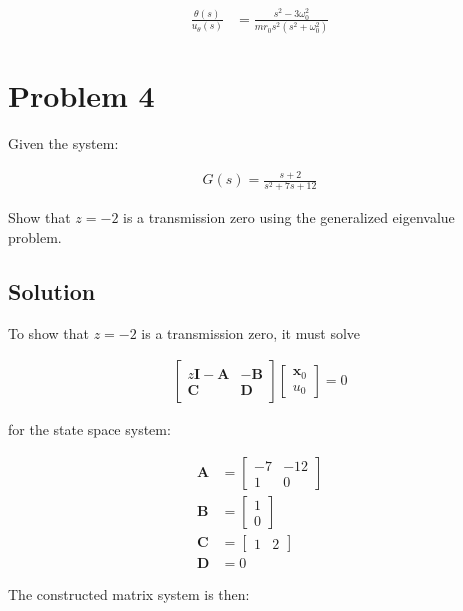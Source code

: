\documentclass[]{article}
\begin{document}
\begin{align*}
	\frac{\theta(s)}{u_{\theta}(s)} &= \frac{s^2 - 3\omega_0^2}{mr_0s^2 (s^2 + \omega_0^2)}
\end{align*}

\section{Problem 4}

Given the system:

\begin{align*}
	G(s) = \frac{s+2}{s^2 + 7s + 12}
\end{align*}

Show that $z=-2$ is a transmission zero using the generalized eigenvalue problem.

\subsection{Solution}

To show that $z=-2$ is a transmission zero, it must solve

\begin{align*}
	\begin{bmatrix}
	z\mathbf{I} - \mathbf{A} & -\mathbf{B} \\
	\mathbf{C} & \mathbf{D}
	\end{bmatrix}
	\begin{bmatrix}
	\mathbf{x}_0 \\
	u_0
	\end{bmatrix} = 0
\end{align*}

for the state space system:

\begin{align*}
	\mathbf{A} &= \begin{bmatrix}
	-7 & -12 \\
	1 & 0
	\end{bmatrix} \\
	\mathbf{B} &= \begin{bmatrix}
	1 \\
	0
	\end{bmatrix}\\
	\mathbf{C} &= \begin{bmatrix}
	1 & 2
	\end{bmatrix} \\
	\mathbf{D} &= 0
\end{align*}

The constructed matrix system is then:
\end{document}
